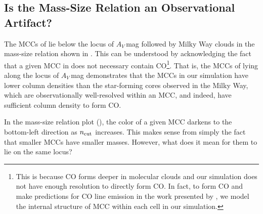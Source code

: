 \IfFileExists{emulateapjlegacy.cls}{\documentclass[iop]{emulateapjlegacy}}{\documentclass[iop]{emulateapj}}
\begin{document}
\subsection{Is the Mass-Size Relation an Observational Artifact?} \label{sec:MR}
The MCCs of \flower lie below the locus of $A_V$\,mag followed
by Milky Way clouds in the mass-size relation shown in . This
can be understood by acknowledging the fact that a given MCC in \flower
does not necessary contain CO\footnote{This is because CO forms deeper in molecular clouds and
our simulation does not have enough resolution to directly form CO. In fact, to form CO and make
predictions for CO line emission in the work presented by
\citet{Vallini18a}, we model the internal structure of MCC within each cell in our simulation.}.
That is, the MCCs of \flower lying along the locus of $A_V$\,mag demonstrates
that the MCCs in our simulation have lower column densities than the
star-forming cores observed in the Milky Way, which are
observationally well-resolved within an MCC, and indeed, have
sufficient column density to form CO.

In the mass-size relation plot (), the color of a given MCC darkens to the bottom-left direction as $n_{\rm cut}$ increases.
This makes sense from simply the fact that smaller MCCs have smaller masses.
However, what does it mean for them to lie on the same locus?
\end{document}
